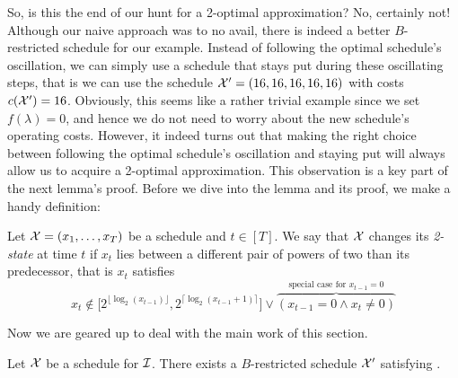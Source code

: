 So, is this the end of our hunt for a 2-optimal approximation? No, certainly not! Although our naive approach was to no avail, there is indeed a better $B$-restricted schedule for our example. Instead of following the optimal schedule's oscillation, we can simply use a schedule that stays put during these oscillating steps, that is we can use the schedule $\mathcal{X}'=(16,16,16,16,16)$ with costs $c(\mathcal{X}')=16$. Obviously, this seems like a rather trivial example since we set $f(\lambda)=0$, and hence we do not need to worry about the new schedule's operating costs. However, it indeed turns out that making the right choice between following the optimal schedule's oscillation and staying put will always allow us to acquire a 2-optimal approximation. This observation is a key part of the next lemma's proof. Before we dive into the lemma and its proof, we make a handy definition:
\begin{defn}
Let $\mathcal{X}=(x_1,\dotsc,x_T)$ be a schedule and $t\in[T]$. We say that $\mathcal{X}$ changes its \emph{2-state} at time $t$ if $x_t$ lies between a different pair of powers of two than its predecessor, that is $x_t$ satisfies
\begin{equation*}
	x_t\notin\bigl[2^{\lfloor \log_2(x_{t-1})\rfloor},2^{\lceil \log_2(x_{t-1}+1)\rceil}\bigr] \lor\overbrace{(x_{t-1}=0\land x_t\neq 0)}^{\text{special case for }x_{t-1}=0}
\end{equation*}
\end{defn}
Now we are geared up to deal with the main work of this section.
\begin{lem}\label{lem:transform_schedule_approx_2}
Let $\mathcal{X}$ be a schedule for $\mathcal{I}$. There exists a $B$-restricted schedule $\mathcal{X}'$ satisfying .
\end{lem}
